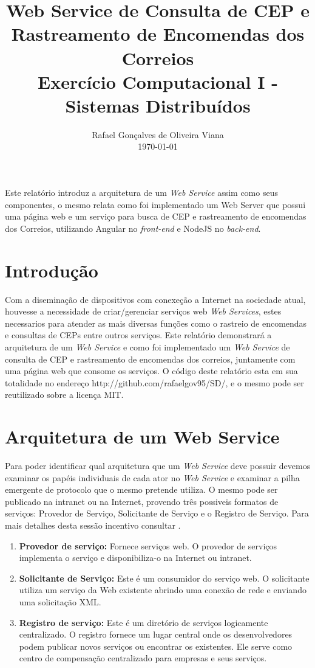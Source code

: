 \documentclass[12pt]{article}
\title{Web Service de Consulta de CEP e Rastreamento de Encomendas dos Correios  \\ Exercício Computacional I - Sistemas Distribuídos}
\author{Rafael Gonçalves de Oliveira Viana\inst{1} \\\vspace*{10pt} \normalsize  \today{} }
\begin{document}
 

\maketitle

     
\begin{resumo} 	
  Este relatório introduz a arquitetura de um \textit{Web Service} assim como seus componentes, o mesmo relata como foi implementado um Web Server que possui uma página web e um serviço para busca de CEP e rastreamento de encomendas dos Correios, utilizando Angular no \textit{front-end} e NodeJS no \textit{back-end}.
\end{resumo}



\section{Introdução}
  Com a diseminação de dispositivos com conexeção a Internet na sociedade atual, houvesse a necessidade de criar/gerenciar serviços web \textit{Web Services}, estes necessarios para atender as mais diversas funções como o rastreio de encomendas e consultas de CEPs entre outros serviços.
  Este relatório demonstrará  a arquitetura de um \textit{Web Service} e como foi implementado um \textit{Web Service} de consulta de CEP e rastreamento de encomendas dos correios, juntamente com uma página web que consome os serviços.
  O código deste relatório esta em sua totalidade no endereço http://github.com/rafaelgov95/SD/, e o mesmo pode ser reutilizado sobre a licença MIT.
\section{Arquitetura de um Web Service}
Para poder identificar qual arquitetura que um \textit{Web Service} deve possuir devemos examinar os papéis individuais de cada ator no \textit{Web Service} e examinar a pilha emergente de protocolo que o mesmo pretende utiliza.
O mesmo pode ser publicado na intranet ou na Internet, provendo três possiveis formatos de serviços: Provedor de Serviço, Solicitante de Serviço e o Registro de Serviço.
Para mais detalhes desta sessão incentivo consultar \cite{tutorial}. 

\begin{enumerate}
	\item \textbf{Provedor de serviço:}
	Fornece serviços web. O provedor de serviços implementa o serviço e disponibiliza-o na Internet ou intranet.
	\item \textbf{Solicitante de Serviço:}
	Este é um consumidor do serviço web. O solicitante utiliza um serviço da Web existente abrindo uma conexão de rede e enviando uma solicitação XML.
	\item \textbf{Registro de serviço:}
	Este é um diretório de serviços logicamente centralizado. O registro fornece um lugar central onde os desenvolvedores podem publicar novos serviços ou encontrar os existentes. Ele serve como centro de compensação centralizado para empresas e seus serviços.
\end{enumerate}
\end{document}
